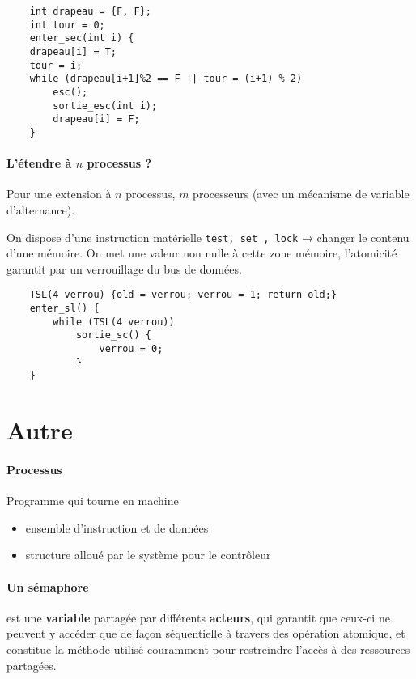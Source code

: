\documentclass[11pt, a4paper]{article}
\begin{document}
    \begin{verbatim}
    int drapeau = {F, F};
    int tour = 0;
    enter_sec(int i) {
    drapeau[i] = T;
    tour = i;
    while (drapeau[i+1]%2 == F || tour = (i+1) % 2)
        esc();
        sortie_esc(int i);
        drapeau[i] = F;
    }
    \end{verbatim}

\paragraph{L'étendre à $n$ processus ?} Pour une extension à $n$ processus, $m$ processeurs (avec un mécanisme de variable d'alternance).

On dispose d'une instruction matérielle \verb|test, set , lock| → changer le contenu d'une mémoire. On met une valeur non nulle à cette zone mémoire, l'atomicité garantit par un verrouillage du bus de données.

    \begin{verbatim}
    TSL(4 verrou) {old = verrou; verrou = 1; return old;}
    enter_sl() {
        while (TSL(4 verrou))
            sortie_sc() {
                verrou = 0;
            }
    }
    \end{verbatim}


\section{Autre}

\paragraph{Processus} Programme qui tourne en machine

	\begin{itemize}
	\item ensemble d'instruction et de données
	\item structure alloué par le système pour le contrôleur
	\end{itemize}

\paragraph{Un sémaphore} est une \textbf{variable} partagée par différents \textbf{acteurs}, qui garantit que ceux-ci ne peuvent y accéder que de façon séquentielle à travers des opération atomique, et constitue la méthode utilisé couramment pour restreindre l'accès à des ressources partagées.
\end{document}
